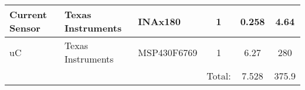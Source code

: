 \begin{table}[H]
\begin{tabular}{|l|l|l|c|c|c|}
\hline
Current Sensor       & Texas Instruments    & INAx180                                   & 1                           & 0.258                           & 4.64                                     \\ 
\hline
uC                   & Texas Instruments    & \textcolor[rgb]{0.2,0.2,0.2}{MSP430F6769} & 1                           & 6.27                            & 280                                      \\ 
\hline
\multicolumn{1}{l}{} & \multicolumn{1}{l}{} &                                           & \multicolumn{1}{l|}{Total:} & 7.528                           & 375.9                                    \\
\cline{4-6}
\end{tabular}
\end{table}